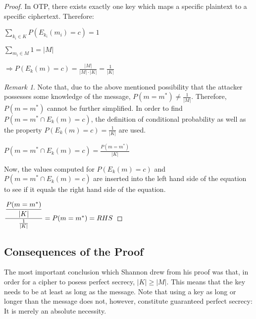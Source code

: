 \documentclass[12pt, a4paper]{report}
\theoremstyle{definition}
\theoremstyle{remark}
\newtheorem{rem}[thm]{Remark}
\begin{document}
\begin{proof}
In OTP, there exists exactly one key which maps a specific plaintext to a specific ciphertext. Therefore:

$\sum\limits_{k_i \in K}
P(E_{k_i}(m_i)=c)
=1$

$\sum\limits_{m_i \in M} 1
= \lvert M \rvert$

$\Rightarrow P({E_k}(m)=c) = \frac{\lvert M \rvert}{\lvert M \rvert \cdot \lvert K \rvert} = \frac{1}{\lvert K \rvert}$

\begin{rem}
Note that, due to the above mentioned possibility that the attacker possesses some knowledge of the message, $P(m=m^{*}) \neq \frac{1}{\lvert M \rvert}$. Therefore, $P(m=m^{*})$ cannot be further simplified. In order to find $P(m=m^{*} \cap {E_k}(m)=c)$, the definition of conditional probability as well as the property $P({E_k}(m)=c) = \frac{1}{\lvert K \rvert}$ are used.
\end{rem}

$P(m=m^{*} \cap {E_k}(m)=c) = \frac{P(m=m^{*})}{\lvert K \rvert}$

Now, the values computed for $P({E_k}(m)=c)$ and $P(m=m^{*} \cap {E_k}(m)=c)$ are inserted into the left hand side of the equation to see if it equals the right hand side of the equation.

$\dfrac{\dfrac{P(m=m^{*})}{\lvert K \rvert}}{\frac{1}{\lvert K \rvert}} = P(m=m^{*}) \\
= RHS$
\end{proof}

\subsection{Consequences of the Proof}


The most important conclusion which Shannon drew from his proof was that, in order for a cipher to posess perfect secrecy, $\lvert K \rvert \geqslant \lvert M \rvert$\cite{ShannonOTP}. This means that the key needs to be at least as long as the message. Note that using a key as long or longer than the message does not, however, constitute guaranteed perfect secrecy: It is merely an absolute necessity.
\end{document}
